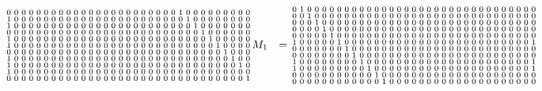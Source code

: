 \documentclass[letterpaper,twocolumn,10pt]{article}
\begin{document}
\begin{figure*}
\begin{align*}
\begin{smallmatrix}
0&0&0&0&0&0&0&0&0&0&0&0&0&0&0&0&0&0&0&0&0&0&0&1&0&0&0&0&0&0&0&0&0 \\
1&0&0&0&0&0&0&0&0&0&0&0&0&0&0&0&0&0&0&0&0&0&0&0&1&0&0&0&0&0&0&0&0 \\
1&0&0&0&0&0&0&0&0&0&0&0&0&0&0&0&0&0&0&0&0&0&0&0&0&1&0&0&0&0&0&0&0 \\
0&0&0&0&0&0&0&0&0&0&0&0&0&0&0&0&0&0&0&0&0&0&0&0&0&0&1&0&0&0&0&0&0 \\
1&0&0&0&0&0&0&0&0&0&0&0&0&0&0&0&0&0&0&0&0&0&0&0&0&0&0&1&0&0&0&0&0 \\
1&0&0&0&0&0&0&0&0&0&0&0&0&0&0&0&0&0&0&0&0&0&0&0&0&0&0&0&1&0&0&0&0 \\
0&0&0&0&0&0&0&0&0&0&0&0&0&0&0&0&0&0&0&0&0&0&0&0&0&0&0&0&0&1&0&0&0 \\
1&0&0&0&0&0&0&0&0&0&0&0&0&0&0&0&0&0&0&0&0&0&0&0&0&0&0&0&0&0&1&0&0 \\
1&0&0&0&0&0&0&0&0&0&0&0&0&0&0&0&0&0&0&0&0&0&0&0&0&0&0&0&0&0&0&1&0 \\
1&0&0&0&0&0&0&0&0&0&0&0&0&0&0&0&0&0&0&0&0&0&0&0&0&0&0&0&0&0&0&0&0 \\
0&0&0&0&0&0&0&0&0&0&0&0&0&0&0&0&0&0&0&0&0&0&0&0&0&0&0&0&0&0&0&0&1
\end{smallmatrix}
&
M_1 &=
\setcounter{MaxMatrixCols}{33}
\begin{smallmatrix}
0&1&0&0&0&0&0&0&0&0&0&0&0&0&0&0&0&0&0&0&0&0&0&0&0&0&0&0&0&0&0&0&0 \\
0&0&1&0&0&0&0&0&0&0&0&0&0&0&0&0&0&0&0&0&0&0&0&0&0&0&0&0&0&0&0&0&0 \\
0&0&0&1&0&0&0&0&0&0&0&0&0&0&0&0&0&0&0&0&0&0&0&0&0&0&0&0&0&0&0&0&0 \\
0&0&0&0&1&0&0&0&0&0&0&0&0&0&0&0&0&0&0&0&0&0&0&0&0&0&0&0&0&0&0&0&0 \\
0&0&0&0&0&1&0&0&0&0&0&0&0&0&0&0&0&0&0&0&0&0&0&0&0&0&0&0&0&0&0&0&0 \\
1&0&0&0&0&0&1&0&0&0&0&0&0&0&0&0&0&0&0&0&0&0&0&0&0&0&0&0&0&0&0&0&1 \\
0&0&0&0&0&0&0&1&0&0&0&0&0&0&0&0&0&0&0&0&0&0&0&0&0&0&0&0&0&0&0&0&0 \\
0&0&0&0&0&0&0&0&1&0&0&0&0&0&0&0&0&0&0&0&0&0&0&0&0&0&0&0&0&0&0&0&0 \\
1&0&0&0&0&0&0&0&0&1&0&0&0&0&0&0&0&0&0&0&0&0&0&0&0&0&0&0&0&0&0&0&1 \\
1&0&0&0&0&0&0&0&0&0&1&0&0&0&0&0&0&0&0&0&0&0&0&0&0&0&0&0&0&0&0&0&1 \\
0&0&0&0&0&0&0&0&0&0&0&1&0&0&0&0&0&0&0&0&0&0&0&0&0&0&0&0&0&0&0&0&0 \\
0&0&0&0&0&0&0&0&0&0&0&0&1&0&0&0&0&0&0&0&0&0&0&0&0&0&0&0&0&0&0&0&0 \\

\end{smallmatrix}
\end{align*}
\end{figure*}
\end{document}
